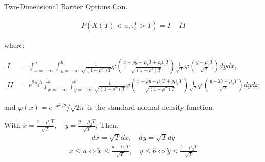 \documentclass{beamer}
\begin{document}
\begin{frame}{Two-Dimensional Barrier Options Con.}

    {\footnotesize \footnotesize
    \begin{align*}
        P(X(T)<a, \tau_b^Y >T)=I - II
    \end{align*}
    \par where:
     {\footnotesize \tiny
    \begin{align*}
        I &= \int_{x=-\infty}^a \int_{y=-\infty}^b \frac{1}{\sqrt{(1-\rho^2)T}} \varphi \left( \frac{x-\rho y-\mu_1 T+\rho\mu_2 T}{\sqrt{(1-\rho^2)T}} \right) \frac{1}{\sqrt{T}} \varphi \left( \frac{y-\mu_2 T}{\sqrt{T}} \right) dy dx, \\
        II &= e^{2\mu_2 b} \int_{x=-\infty}^a \int_{y=-\infty}^b \frac{1}{\sqrt{(1-\rho^2)T}} \varphi \left( \frac{x-\rho y-\mu_1 T+\rho\mu_2 T}{\sqrt{(1-\rho^2)T}} \right) \frac{1}{\sqrt{T}} \varphi \left( \frac{y-2b-\mu_2 T}{\sqrt{T}} \right) dy dx,
        \end{align*}
    
     }
     \par and \(\varphi(x)=e^{-x^2/2}/\sqrt{2\pi}\) is the standard normal density function. 
     \vspace{1em}
     \par With $\tilde{x}=\frac{x-\mu_1 T}{\sqrt{T}}, \quad \tilde{y}=\frac{y-\mu_2 T}{\sqrt{T}}$, Then:
     \begin{align*}
        dx = \sqrt{T}  d\tilde{x}, \quad dy = \sqrt{T}  d\tilde{y}
     \end{align*}
     \begin{align*}
        x \leq a \iff \tilde{x} \leq \frac{a - \mu_1 T}{\sqrt{T}}, \quad y \leq b \iff \tilde{y} \leq \frac{b - \mu_2 T}{\sqrt{T}}
     \end{align*}

    }
    
\end{frame}
\end{document}
